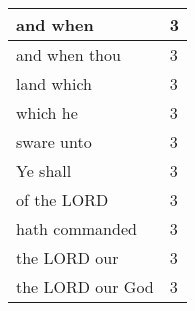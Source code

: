 \begin{center}
\begin{longtable}{|p{3.0in}|p{0.5in}|}
and when & 3\\ \hline 
and when thou & 3\\ \hline 
land which & 3\\ \hline 
which he & 3\\ \hline 
sware unto & 3\\ \hline 
Ye shall & 3\\ \hline 
of the LORD & 3\\ \hline 
hath commanded & 3\\ \hline 
the LORD our & 3\\ \hline 
the LORD our God & 3\\ \hline 
\end{longtable}
\end{center}





